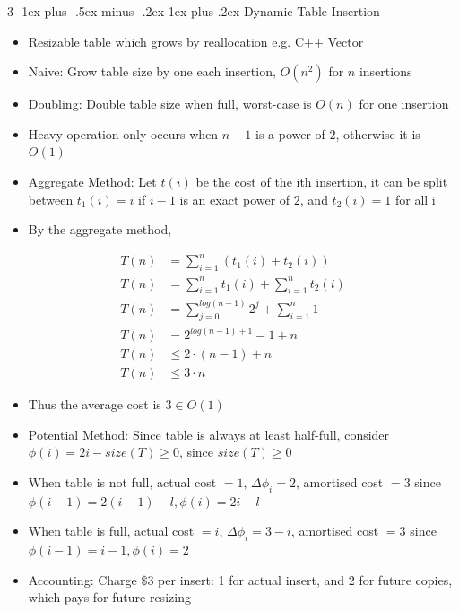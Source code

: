 \documentclass[10pt, landscape]{article}
\makeatletter
\renewcommand{\subsection}{\@startsection{subsection}{3}{0mm}%
                                {-1ex plus -.5ex minus -.2ex}%
                                {1ex plus .2ex}%
                                {\normalfont\small\bfseries}}%
\makeatother
\begin{document}
\begin{multicols*}{3}
\subsection{Dynamic Table Insertion}
\begin{itemize}
    \item Resizable table which grows by reallocation e.g. C++ Vector
    \item Naive: Grow table size by one each insertion, $O(n^2)$ for $n$ insertions
    \item Doubling: Double table size when full, worst-case is $O(n)$ for one insertion
    \item Heavy operation only occurs when $n-1$ is a power of $2$, otherwise it is $O(1)$
    \item Aggregate Method: Let $t(i)$ be the cost of the ith insertion, it can be split between $t_1(i)=i$ if $i-1$ is an exact power of $2$, and $t_2(i)=1$ for all i
    \item By the aggregate method,
\end{itemize}
\begin{align*}
T(n)&=\sum_{i=1}^n(t_1(i)+t_2(i))\\
T(n)&=\sum_{i=1}^nt_1(i)+\sum_{i=1}^nt_2(i)\\
T(n)&=\sum_{j=0}^{log(n-1)}2^j+\sum_{i=1}^n1\\
T(n)&=2^{log(n-1)+1}-1+n\\
T(n)&\leq 2\cdot (n-1)+n\\
T(n)&\leq 3 \cdot n
\end{align*}
\begin{itemize}
    \item Thus the average cost is $3 \in O(1)$
    \item Potential Method: Since table is always at least half-full, consider $\phi(i)=2i-size(T)\geq0$, since $size(T) \geq 0$
    \item When table is not full, actual cost $=1$, $\Delta\phi_i=2$, amortised cost $=3$ since $\phi(i-1)=2(i-1)-l, \phi(i)=2i-l$
    \item When table is full, actual cost $=i$, $\Delta\phi_i=3-i$, amortised cost $=3$ since $\phi(i-1)=i-1,\phi(i)=2$
    \item Accounting: Charge $\$3$ per insert: 1 for actual insert, and 2 for future copies, which pays for future resizing 
\end{itemize}


\end{multicols*}
\end{document}
